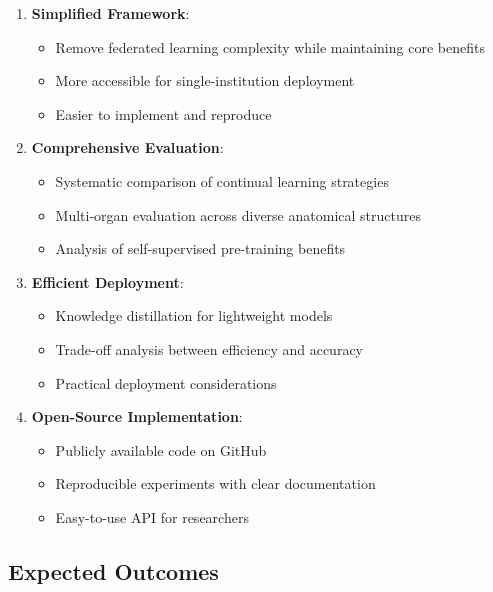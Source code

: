 \documentclass[conference]{IEEEtran}
\begin{document}
\begin{enumerate}
    \item \textbf{Simplified Framework}:
    \begin{itemize}
        \item Remove federated learning complexity while maintaining core benefits
        \item More accessible for single-institution deployment
        \item Easier to implement and reproduce
    \end{itemize}
    
    \item \textbf{Comprehensive Evaluation}:
    \begin{itemize}
        \item Systematic comparison of continual learning strategies
        \item Multi-organ evaluation across diverse anatomical structures
        \item Analysis of self-supervised pre-training benefits
    \end{itemize}
    
    \item \textbf{Efficient Deployment}:
    \begin{itemize}
        \item Knowledge distillation for lightweight models
        \item Trade-off analysis between efficiency and accuracy
        \item Practical deployment considerations
    \end{itemize}
    
    \item \textbf{Open-Source Implementation}:
    \begin{itemize}
        \item Publicly available code on GitHub
        \item Reproducible experiments with clear documentation
        \item Easy-to-use API for researchers
    \end{itemize}
\end{enumerate}

\subsection{Expected Outcomes}
\end{document}
